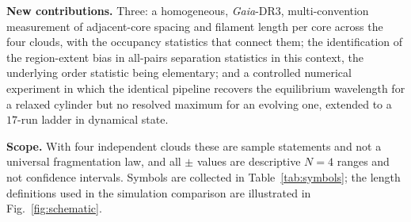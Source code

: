 \documentclass[usenatbib,twoside,twocolumn]{mnras}
\begin{document}
\smallskip\noindent\textbf{New contributions.} Three: a homogeneous, \textit{Gaia}-DR3, multi-convention measurement of adjacent-core spacing and filament length per core across the four clouds, with the occupancy statistics that connect them; the identification of the region-extent bias in all-pairs separation statistics in this context, the underlying order statistic being elementary; and a controlled numerical experiment in which the identical pipeline recovers the equilibrium wavelength for a relaxed cylinder but no resolved maximum for an evolving one, extended to a $17$-run ladder in dynamical state.

\smallskip\noindent\textbf{Scope.} With four independent clouds these are sample statements and not a universal fragmentation law, and all $\pm$ values are descriptive $N=4$ ranges and not confidence intervals. Symbols are collected in Table~\ref{tab:symbols}; the length definitions used in the simulation comparison are illustrated in Fig.~\ref{fig:schematic}.
\end{document}
